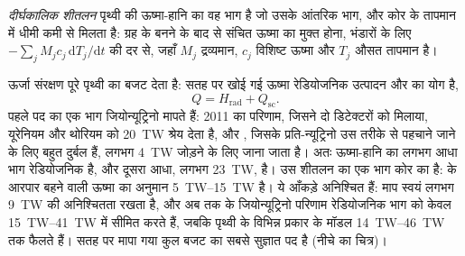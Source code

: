 \begin{definition}[दीर्घकालिक शीतलन]\label{def:b1:heat-budget:secular-cooling}
\emph{दीर्घकालिक शीतलन} पृथ्वी की ऊष्मा-हानि का वह भाग है जो उसके आंतरिक भाग,  और कोर के तापमान में धीमी कमी से मिलता है: ग्रह के बनने के बाद से संचित ऊष्मा का मुक्त होना, भंडारों के लिए $-\sum_j M_j c_j\,\mathrm dT_j/\mathrm dt$ की दर से, जहाँ $M_j$ द्रव्यमान, $c_j$ विशिष्ट ऊष्मा और $T_j$ औसत तापमान है।
\end{definition}

ऊर्जा संरक्षण पूरे पृथ्वी का बजट देता है: सतह पर खोई गई ऊष्मा रेडियोजनिक उत्पादन और  का योग है,
\[
  Q = H_{\text{rad}} + Q_{\text{sc}} .
\]
पहले पद का एक भाग जियोन्यूट्रिनो मापते हैं: 2011 का परिणाम, जिसने दो डिटेक्टरों को मिलाया, यूरेनियम और थोरियम को \qty{20}{TW} श्रेय देता है, और , जिसके प्रति-न्यूट्रिनो उस तरीके से पहचाने जाने के लिए बहुत दुर्बल हैं, लगभग \qty{4}{TW} जोड़ने के लिए जाना जाता है।
अतः ऊष्मा-हानि का लगभग आधा भाग रेडियोजनिक है, और दूसरा आधा, लगभग \qty{23}{TW},  है। उस शीतलन का एक भाग कोर का है:  के आरपार बहने वाली ऊष्मा का अनुमान \qtyrange{5}{15}{TW} है। ये आँकड़े अनिश्चित हैं: माप स्वयं लगभग \qty{9}{TW} की अनिश्चितता रखता है, और अब तक के जियोन्यूट्रिनो परिणाम रेडियोजनिक भाग को केवल \qtyrange{15}{41}{TW} में सीमित करते हैं, जबकि पृथ्वी के विभिन्न प्रकार के मॉडल \qtyrange{14}{46}{TW} तक फैलते हैं। सतह पर मापा गया कुल बजट का सबसे सुज्ञात पद है (नीचे का चित्र)।

